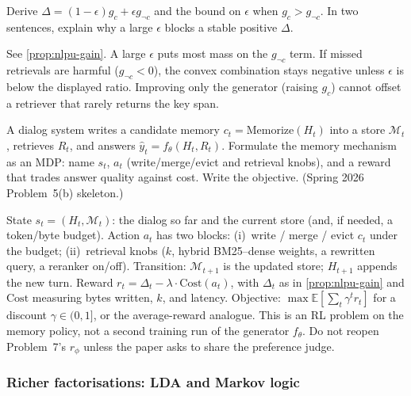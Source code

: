 \begin{exercise}
\label{ex:nlpu-gain}
Derive $\Delta=(1-\epsilon)g_c+\epsilon g_{\neg c}$ and the bound on $\epsilon$ when $g_c>g_{\neg c}$. In two sentences, explain why a large $\epsilon$ blocks a stable positive $\Delta$.
\end{exercise}

\begin{solution}
See \cref{prop:nlpu-gain}. A large $\epsilon$ puts most mass on the $g_{\neg c}$ term. If missed retrievals are harmful ($g_{\neg c}<0$), the convex combination stays negative unless $\epsilon$ is below the displayed ratio. Improving only the generator (raising $g_c$) cannot offset a retriever that rarely returns the key span.
\end{solution}

\begin{exercise}
\label{ex:nlpu-rag-mdp}
A dialog system writes a candidate memory $c_t=\mathrm{Memorize}(H_t)$ into a store $\mathcal{M}_t$, retrieves $R_t$, and answers $\hat y_t=f_\theta(H_t,R_t)$. Formulate the memory mechanism as an MDP: name $s_t$, $a_t$ (write/merge/evict and retrieval knobs), and a reward that trades answer quality against cost. Write the objective. (Spring 2026 Problem~5(b) skeleton.)
\end{exercise}

\begin{solution}
State $s_t=(H_t,\mathcal{M}_t)$: the dialog so far and the current store (and, if needed, a token/byte budget). Action $a_t$ has two blocks: (i)~write / merge / evict $c_t$ under the budget; (ii)~retrieval knobs ($k$, hybrid BM25--dense weights, a rewritten query, a reranker on/off). Transition: $\mathcal{M}_{t+1}$ is the updated store; $H_{t+1}$ appends the new turn. Reward $r_t=\Delta_t-\lambda\cdot\mathrm{Cost}(a_t)$, with $\Delta_t$ as in \cref{prop:nlpu-gain} and $\mathrm{Cost}$ measuring bytes written, $k$, and latency. Objective: $\max\mathbb{E}[\sum_t\gamma^t r_t]$ for a discount $\gamma\in(0,1]$, or the average-reward analogue. This is an RL problem on the memory policy, not a second training run of the generator $f_\theta$. Do not reopen Problem~7's $r_\phi$ unless the paper asks to share the preference judge.
\end{solution}


\subsubsection{Richer factorisations: LDA and Markov logic}
\label{subsubsec:nlpu-lda-mln}

